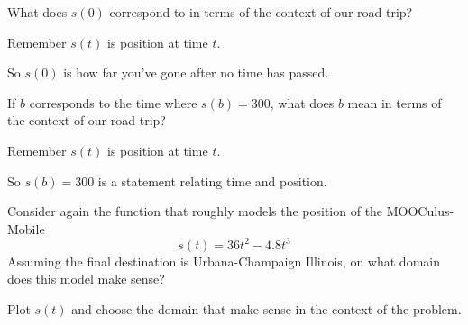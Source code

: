 \documentclass{ximera}
\begin{document}
\begin{problem} %
What does $s(0)$ correspond to in terms of the context of our road
trip?
\begin{hint}
Remember $s(t)$ is position at time $t$.
\end{hint}
\begin{hint}
So $s(0)$ is how far you've gone after no time has passed. 
\end{hint}
\begin{prompt}
  \begin{multipleChoice}
  \end{multipleChoice}
\end{prompt}
\end{problem}

\begin{problem} %
If $b$ corresponds to the time where $s(b) = 300$, what does $b$ mean
in terms of the context of our road trip?
\begin{hint}
Remember $s(t)$ is position at time $t$.
\end{hint}
\begin{hint}
So $s(b)=300$ is a statement relating time and position.  
\end{hint}
\begin{prompt}
  \begin{multipleChoice}
  \end{multipleChoice}
\end{prompt}
\end{problem}


\begin{problem} %
Consider again the function that roughly models the position of the
MOOCulus-Mobile
\[
s(t) = 36t^2 -4.8t^3
\]
Assuming the final destination is Urbana-Champaign Illinois, on what
domain does this model make sense?
\begin{hint}
  Plot $s(t)$ and choose the domain that make sense in the context of
  the problem.
\end{hint}
\end{problem}
\end{document}
